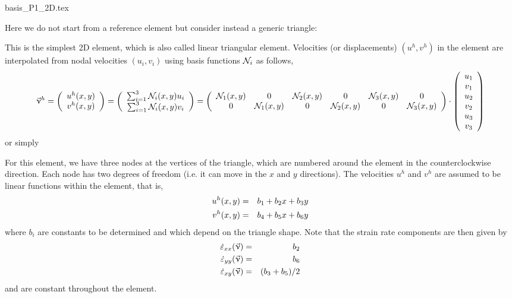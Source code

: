 \begin{flushright} {\tiny {\color{gray} basis\_P1\_2D.tex}} \end{flushright}

Here we do not start from a reference element but consider instead a generic triangle:



This is the simplest 2D element, which is also called linear triangular element.
Velocities (or displacements) $(u^h,v^h)$ in the element are interpolated from nodal velocities
$(u_i,v_i)$ using basis functions ${\mathcal{N}}_i$ as follows,
\[
\vec\upnu^h=
\left(
\begin{array}{c}
u^h(x,y) \\v^h(x,y)
\end{array}
\right)
=
\left(
\begin{array}{c}
\sum_{i=1}^3 {\mathcal{N}}_i(x,y) u_i \\
\sum_{i=1}^3 {\mathcal{N}}_i(x,y) v_i
\end{array}
\right)
=
\left(
\begin{array}{cccccc}
{\mathcal{N}}_1(x,y) & 0 & {\mathcal{N}}_2(x,y) & 0 & {\mathcal{N}}_3(x,y) & 0\\
0 & {\mathcal{N}}_1(x,y) & 0 & {\mathcal{N}}_2(x,y) & 0 & {\mathcal{N}}_3(x,y)\\
\end{array}
\right)
\cdot
\left(
\begin{array}{c}
u_1 \\ v_1 \\ u_2 \\ v_2 \\ u_3 \\ v_3
\end{array}
\right)
\]
or simply 

For this element, we have three nodes at the vertices of the triangle, which are 
numbered around the element in the counterclockwise direction. 
Each node has two degrees of freedom (i.e. it can move in the $x$ and $y$ directions). 
The velocities $u^h$ and $v^h$ are assumed to be linear functions within the element, that is, 
\begin{eqnarray}
u^h(x,y)&=&b_1 +b_2x+b_3y \nonumber\\
v^h(x,y)&=&b_4 +b_5x+b_6y
\end{eqnarray}
where $b_i$ are constants to be determined and which depend on the triangle shape.
Note that the strain rate components are then given by
\begin{eqnarray}
\dot\varepsilon_{xx}(\vec\upnu)&=&b_2  \nonumber\\
\dot\varepsilon_{yy}(\vec\upnu)&=&b_6  \nonumber\\
\dot\varepsilon_{xy}(\vec\upnu)&=&(b_3+b_5)/2 \nonumber
\end{eqnarray}
and are constant throughout the element.

